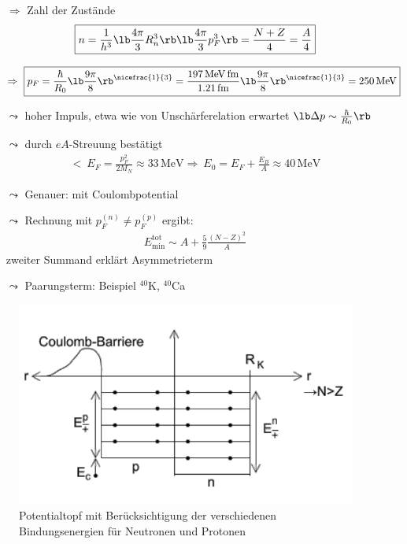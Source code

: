 \begin{itemize}
\item[$\Rightarrow$] Zahl der Zustände
\begin{align}
\boxed{n= \frac{1}{h^3} \lb  \frac{4\pi}{3} R_n^3\rb \lb \frac{4\pi}{3} p_F^3\rb = \frac{N+Z}{4}= \frac{A}{4}}
\end{align}
\begin{align}
\Rightarrow\ \boxed{p_F = \frac{\hbar}{R_0}\lb \frac{9 \pi}{8}\rb ^{\nicefrac{1}{3}} = \frac{197\,\mathrm{MeV\,fm}}{1.21\,\mathrm{fm}}\lb \frac{9 \pi}{8}\rb ^{\nicefrac{1}{3}} = 250\,\mathrm{MeV}}
\end{align}
\item[$\leadsto$] hoher Impuls, etwa wie von Unschärferelation erwartet $\lb \Delta p \sim \frac{\hbar}{R_0}\rb $
\item[$\leadsto$] durch $eA$-Streuung bestätigt
\begin{align}
\lt \ \boxed{{E_F} = \frac{p_F^2}{2M_N} \approx 33\,\mathrm{MeV} \Rightarrow\ E_0 = E_F+ \frac{E_B}{A} \approx 40 \, \mathrm{MeV}}
\end{align}
\item[$\leadsto$] Genauer: mit Coulombpotential
\item[$\leadsto$] Rechnung mit $p_F^{(n)} \neq p_F^{(p)}$ ergibt:
\begin{align}
E_\mathrm{min}^\mathrm{tot} \sim A + \frac{5}{9} \frac{(N-Z)^2}{A}
\end{align}
zweiter Summand erklärt Asymmetrieterm
\item[$\leadsto$] Paarungsterm: Beispiel $^{40}$K, $^{40}$Ca
\end{itemize}

\begin{figure}[!ht]
\centering
\includegraphics[width=.5\textwidth]{imgs/ep5-fig-4-9.pdf}
\caption{Potentialtopf mit Berücksichtigung der verschiedenen Bindungsenergien für Neutronen und Protonen \label{fig:4.9}}
\end{figure}

